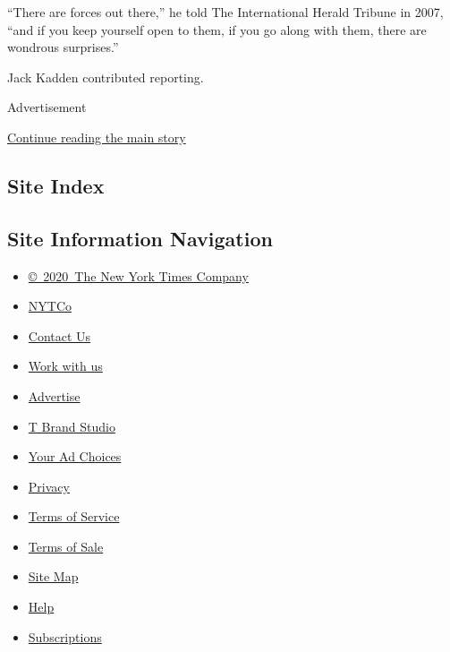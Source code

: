 ``There are forces out there,'' he told The International Herald Tribune
in 2007, ``and if you keep yourself open to them, if you go along with
them, there are wondrous surprises.''

Jack Kadden contributed reporting.

Advertisement

\protect\hyperlink{after-bottom}{Continue reading the main story}

\hypertarget{site-index}{%
\subsection{Site Index}\label{site-index}}

\hypertarget{site-information-navigation}{%
\subsection{Site Information
Navigation}\label{site-information-navigation}}

\begin{itemize}
\tightlist
\item
  \href{https://help.nytimes3xbfgragh.onion/hc/en-us/articles/115014792127-Copyright-notice}{©~2020~The
  New York Times Company}
\end{itemize}

\begin{itemize}
\tightlist
\item
  \href{https://www.nytco.com/}{NYTCo}
\item
  \href{https://help.nytimes3xbfgragh.onion/hc/en-us/articles/115015385887-Contact-Us}{Contact
  Us}
\item
  \href{https://www.nytco.com/careers/}{Work with us}
\item
  \href{https://nytmediakit.com/}{Advertise}
\item
  \href{http://www.tbrandstudio.com/}{T Brand Studio}
\item
  \href{https://www.nytimes3xbfgragh.onion/privacy/cookie-policy\#how-do-i-manage-trackers}{Your
  Ad Choices}
\item
  \href{https://www.nytimes3xbfgragh.onion/privacy}{Privacy}
\item
  \href{https://help.nytimes3xbfgragh.onion/hc/en-us/articles/115014893428-Terms-of-service}{Terms
  of Service}
\item
  \href{https://help.nytimes3xbfgragh.onion/hc/en-us/articles/115014893968-Terms-of-sale}{Terms
  of Sale}
\item
  \href{https://spiderbites.nytimes3xbfgragh.onion}{Site Map}
\item
  \href{https://help.nytimes3xbfgragh.onion/hc/en-us}{Help}
\item
  \href{https://www.nytimes3xbfgragh.onion/subscription?campaignId=37WXW}{Subscriptions}
\end{itemize}

